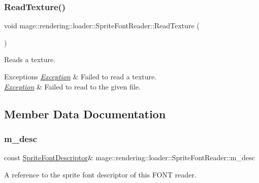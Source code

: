 \subsubsection{\texorpdfstring{Read\+Texture()}{ReadTexture()}}
{\footnotesize\ttfamily void mage\+::rendering\+::loader\+::\+Sprite\+Font\+Reader\+::\+Read\+Texture (\begin{DoxyParamCaption}{ }\end{DoxyParamCaption})\hspace{0.3cm}{\ttfamily [private]}}

Reads a texture.


\begin{DoxyExceptions}{Exceptions}
{\em \mbox{\hyperlink{classmage_1_1_exception}{Exception}}} & Failed to read a texture. \\
\hline
{\em \mbox{\hyperlink{classmage_1_1_exception}{Exception}}} & Failed to read to the given file. \\
\hline
\end{DoxyExceptions}


\subsection{Member Data Documentation}
\mbox{\label{classmage_1_1rendering_1_1loader_1_1_sprite_font_reader_af346b7f0f090f5c9994d60684ccb5960}} 
\subsubsection{\texorpdfstring{m\+\_\+desc}{m\_desc}}
{\footnotesize\ttfamily const \mbox{\hyperlink{classmage_1_1rendering_1_1_sprite_font_descriptor}{Sprite\+Font\+Descriptor}}\& mage\+::rendering\+::loader\+::\+Sprite\+Font\+Reader\+::m\+\_\+desc\hspace{0.3cm}{\ttfamily [private]}}

A reference to the sprite font descriptor of this F\+O\+NT reader. \mbox{\label{classmage_1_1rendering_1_1loader_1_1_sprite_font_reader_a2d152614490f697a9d737aae446a84c9}} 

